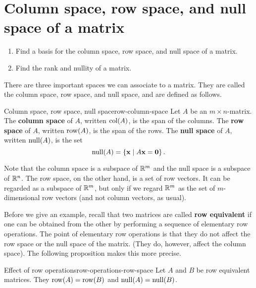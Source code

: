 \section{Column space, row space, and null space of a matrix}

\begin{outcome}
  \begin{enumerate}
  \item Find a basis for the column space, row space, and null space
    of a matrix.
  \item Find the rank and nullity of a matrix.
  \end{enumerate}
\end{outcome}

There are three important spaces we can associate to a matrix. They
are called the column space, row space, and null space, and are
defined as follows.

\begin{definition}{Column space, row space, null space}{row-column-space}
  Let $A$ be an $m\times n$-matrix.  The \textbf{column space}%
   of $A$, written $\col(A)$, is the span
  of the columns. The \textbf{row space}%
   of $A$, written $\row(A)$, is the span of
  the rows.  The \textbf{null space}%
   of $A$, written $\nullspace(A)$, is the
  set
  \begin{equation*}
    \nullspace(A) =\set{\vect{x} \mid A \vect{x} =\vect{0}}.
  \end{equation*}
\end{definition}

Note that the column space is a subspace of $\mathbb{R}^m$ and the null space
is a subspace of $\mathbb{R}^n$. The row space, on the other hand, is a set of
row vectors. It can be regarded as a subspace of $\mathbb{R}^m$, but only if
we regard $\mathbb{R}^m$ as the set of $m$-dimensional row vectors (and not
column vectors, as usual).

Before we give an example, recall that two matrices are called
\textbf{row equivalent}%
%
 if one can be obtained from the other by
performing a sequence of elementary row operations. The point of
elementary row operations is that they do not affect the row space or
the null space of the matrix. (They do, however, affect the column
space). The following proposition makes this more precise.

\begin{proposition}{Effect of row operations}{row-operations-row-space}
  Let $A$ and $B$ be row equivalent matrices. They $\row(A)=\row(B)$
  and $\nullspace(A)=\nullspace(B)$.
\end{proposition}

